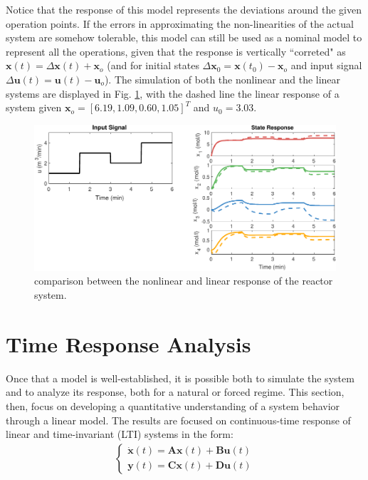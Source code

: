 \documentclass[a4paper,11pt]{book}
\numberwithin{figure}{chapter}
\numberwithin{equation}{chapter}
\numberwithin{table}{chapter}
\theoremstyle{definition}
\begin{document}
Notice that the response of this model represents the deviations around the given operation points. If the errors in approximating the non-linearities of the actual system are somehow tolerable, this model can still be used as a nominal model to represent all the operations, given that the response is vertically ``correted" as $\bm{x}(t) = \Delta \bm{x}(t) + \bm{x}_o$ (and for initial states $\Delta \bm{x}_0 = \bm{x}(t_0) - \bm{x}_o$ and input signal $\Delta \bm{u}(t) = \bm{u}(t) - \bm{u}_o$). The simulation of both the nonlinear and the linear systems are displayed in Fig. \ref{fig:linResp01}, with the dashed line the linear response of a system given $\bm{x}_o = [6.19, 1.09, 0.60, 1.05]^T$ and $u_0 = 3.03$.

\begin{figure}[ht]
	\centering
	\includegraphics[width=\textwidth]{chapter2/linResp01}
	\caption{comparison between the nonlinear and linear response of the reactor system.}
	\label{fig:linResp01}
\end{figure}

\section{Time Response Analysis}

Once that a model is well-established, it is possible both to simulate the system and to analyze its response, both for a natural or forced regime. This section, then, focus on developing a quantitative understanding of a system behavior through a linear model. The results are focused on continuous-time response of linear and time-invariant (LTI) systems in the form:
\begin{align}
\begin{cases}
	\bm{\dot{x}}(t) = \bm{A} \bm{x}(t) + \bm{B} \bm{u}(t) \\
	\bm{y}(t) = \bm{C} \bm{x}(t) + \bm{D} \bm{u}(t)
\end{cases}
\end{align}
\end{document}
